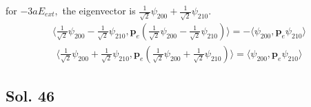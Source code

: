 \begin{enumerate}
    for $-3aE_{ext},$ the eigenvector is 
    $
   \frac{1}{\sqrt{2}} \psi_{200} + \frac{1}{\sqrt{2}}\psi_{210}.
    $
    \begin{align*}
        \langle\frac{1}{\sqrt{2}}\psi_{200} - \frac{1}{\sqrt{2}}\psi_{210}, \bm p_e(\frac{1}{\sqrt{2}}\psi_{200} - \frac{1}{\sqrt{2}}\psi_{210})\rangle
        =-\langle\psi_{200}, \bm p_e \psi_{210}\rangle
    \end{align*}
    \begin{align*}
        \langle\frac{1}{\sqrt{2}}\psi_{200} + \frac{1}{\sqrt{2}}\psi_{210}, \bm p_e(\frac{1}{\sqrt{2}}\psi_{200} + \frac{1}{\sqrt{2}}\psi_{210})\rangle
        =\langle\psi_{200}, \bm p_e \psi_{210}\rangle
    \end{align*}

\end{enumerate}
\subsection*{Sol. 46}
